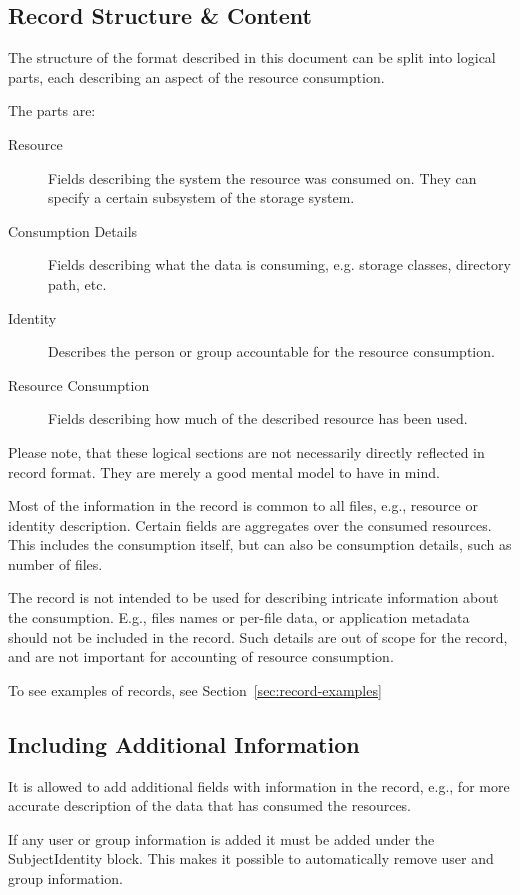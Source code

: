 \subsection{Record Structure \& Content}

The structure of the format described in this document can be split into
logical parts, each describing an aspect of the resource consumption.

The parts are:

\begin{description}

\item[Resource] Fields describing the system the resource was consumed on. They 
can specify a certain subsystem of the storage system.

\item[Consumption Details] Fields describing what the data is consuming, e.g. 
storage classes, directory path, etc.

\item[Identity] Describes the person or group accountable for the resource
consumption.

\item[Resource Consumption] Fields describing how much of the described
resource has been used.

\end{description}

Please note, that these logical sections are not necessarily directly reflected
in record format. They are merely a good mental model to have in mind.

Most of the information in the record is common to all files, e.g., resource or
identity description. Certain fields are aggregates over the consumed
resources. This includes the consumption itself, but can also be consumption
details, such as number of files.

The record is not intended to be used for describing intricate information
about the consumption. E.g., files names or per-file data, or application
metadata should not be included in the record. Such details are out of scope
for the record, and are not important for accounting of resource consumption.

To see examples of records, see Section~\ref{sec:record-examples}


\subsection{Including Additional Information}

It is allowed to add additional fields with information in the record, e.g.,
for more accurate description of the data that has consumed the resources.

If any user or group information is added it must be added under the
SubjectIdentity block. This makes it possible to automatically remove user
and group information.

